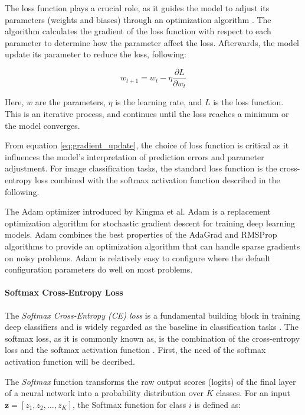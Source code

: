 The loss function plays a crucial role, as it guides the model to adjust its parameters (weights and biases) through an optimization algorithm \cite{Goodfellow-et-al-2016}. The algorithm calculates the gradient of the loss function with respect to each parameter to determine how the parameter affect the loss. Afterwards, the model update its parameter to reduce the loss, following:

\begin{equation}
    \label{eq:gradient_update}
    w_{t+1} = w_t - \eta \frac{\partial L}{\partial w_t}
\end{equation}

Here, $w$ are the parameters, $\eta$ is the learning rate, and $L$ is the loss function. This is an iterative process, and continues until the loss reaches a minimum or the model converges.

From equation \eqref{eq:gradient_update}, the choice of loss function is critical as it influences the model's interpretation of prediction errors and parameter adjustment. For image classification tasks, the standard loss function is the cross-entropy loss combined with the softmax activation function \cite{zhang2023dive} described in the following.

The Adam optimizer introduced by Kingma et al. \cite{kingma2017adammethodstochasticoptimization} 
Adam is a replacement optimization algorithm for stochastic gradient descent for training deep learning models.
Adam combines the best properties of the AdaGrad and RMSProp algorithms to provide an optimization algorithm that can handle sparse gradients on noisy problems.
Adam is relatively easy to configure where the default configuration parameters do well on most problems.

\paragraph{Softmax Cross-Entropy Loss}
The \emph{Softmax Cross-Entropy (CE) loss} is a fundamental building block in training deep classifiers and is widely regarded as the baseline in classification tasks \cite{zhang2023deep, cs231n, pytorch_crossentropy}. The softmax loss, as it is commonly known as, is the combination of the cross-entropy loss and the softmax activation function \cite{zhang2023dive,Goodfellow-et-al-2016}. First, the need of the softmax activation function will be decribed.

The \textit{Softmax} function transforms the raw output scores (logits) of the final layer of a neural network into a probability distribution over \( K \) classes. For an input \( \mathbf{z} = [z_1, z_2, \dots, z_K] \), the Softmax function for class \( i \) is defined as:

